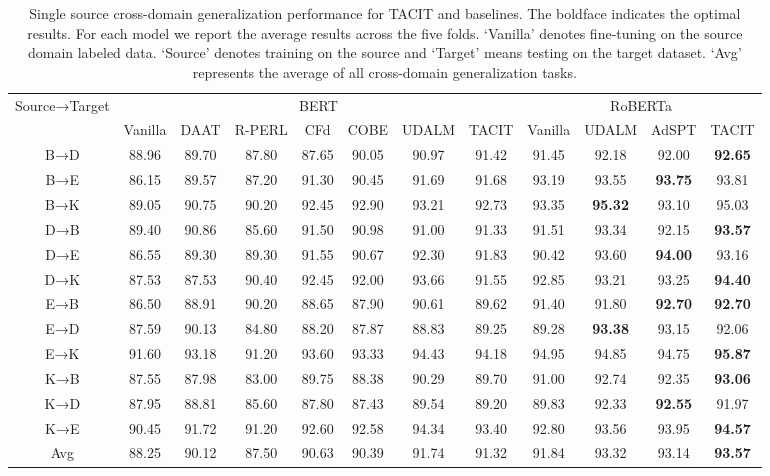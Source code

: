 \documentclass[letterpaper]{article} %
\begin{document}
\begin{table}[htbp]
	\centering
	\setlength\tabcolsep{1.6mm}
	\renewcommand{\arraystretch}{0.5}
	\begin{tabular}{cccccccc|cccc}
		\hline \hline 
		\multirow{2}[0]{*}{Source→Target} & \multicolumn{7}{c}{BERT} & \multicolumn{4}{c}{RoBERTa} \\ \cline{2-12}
		& Vanilla & DAAT & R-PERL & CFd   & COBE  & UDALM & TACIT & Vanilla & UDALM & AdSPT & TACIT \\ \hline 
		B→D & 88.96 & 89.70 & 87.80  & 87.65 & 90.05 & 90.97 & 91.42 & 91.45 & 92.18 & 92.00 & \textbf{92.65} \\
		B→E & 86.15 & 89.57 & 87.20  & 91.30 & 90.45 & 91.69 & 91.68 & 93.19 & 93.55 & \textbf{93.75} & 93.81 \\
		B→K & 89.05 & 90.75 & 90.20  & 92.45 & 92.90 & 93.21 & 92.73 & 93.35 & \textbf{95.32} & 93.10 & 95.03 \\
		D→B & 89.40 & 90.86 & 85.60  & 91.50 & 90.98 & 91.00 & 91.33 & 91.51 & 93.34 & 92.15 & \textbf{93.57} \\
		D→E & 86.55 & 89.30 & 89.30  & 91.55 & 90.67 & 92.30 & 91.83 & 90.42 & 93.60 & \textbf{94.00} & 93.16 \\
		D→K & 87.53 & 87.53 & 90.40  & 92.45 & 92.00 & 93.66 & 91.55 & 92.85 & 93.21 & 93.25 & \textbf{94.40} \\
		E→B & 86.50 & 88.91 & 90.20  & 88.65 & 87.90 & 90.61 & 89.62 & 91.40 & 91.80 & \textbf{92.70} & \textbf{92.70} \\
		E→D & 87.59 & 90.13 & 84.80  & 88.20 & 87.87 & 88.83 & 89.25 & 89.28 & \textbf{93.38} & 93.15 & 92.06 \\
		E→K & 91.60 & 93.18 & 91.20  & 93.60 & 93.33 & 94.43 & 94.18 & 94.95 & 94.85 & 94.75 & \textbf{95.87} \\
		K→B & 87.55 & 87.98 & 83.00  & 89.75 & 88.38 & 90.29 & 89.70 & 91.00 & 92.74 & 92.35 & \textbf{93.06} \\
		K→D & 87.95 & 88.81 & 85.60  & 87.80 & 87.43 & 89.54 & 89.20 & 89.83 & 92.33 & \textbf{92.55} & 91.97 \\
		K→E & 90.45 & 91.72 & 91.20  & 92.60 & 92.58 & 94.34 & 93.40 & 92.80 & 93.56 & 93.95 & \textbf{94.57} \\ \hline 
		Avg & 88.25 & 90.12 & 87.50  & 90.63 & 90.39 & 91.74 & 91.32 & 91.84 & 93.32 & 93.14 & \textbf{93.57} \\ \hline \hline 
	\end{tabular}%
	\caption{Single source cross-domain generalization performance for TACIT and baselines. The boldface indicates the optimal results. For each model we report the average results across the five folds. `Vanilla' denotes fine-tuning on the source domain labeled data. `Source' denotes training on the source and `Target' means testing on the target dataset. `Avg' represents the average of all cross-domain generalization tasks.}
	\label{tab:results}%
\end{table}%
\end{document}
